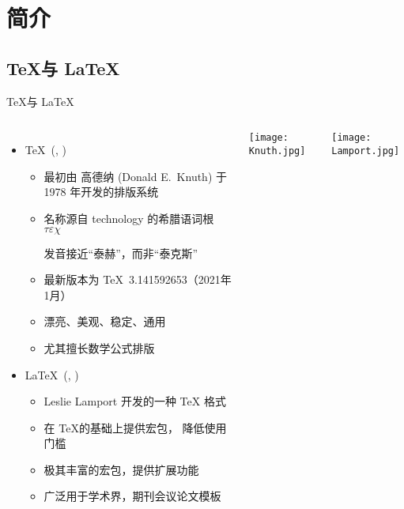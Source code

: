 
\section{简介}

\subsection{\TeX 与 \LaTeX}

\begin{frame}[fragile]{\TeX 与 \LaTeX}
  \begin{columns}[T]
    \begin{itemize}
      \item \TeX\ (,
        )
        \begin{itemize}
          \item 最初由 高德纳 (Donald E.~Knuth) 于 1978 年开发的排版系统
          \item 名称源自 technology 的希腊语词根 $\tau\varepsilon\chi$ \par
                发音接近“泰赫”，而非“泰克斯”
          \item 最新版本为 \TeX\ 3.141592653（2021年1月）
          \item 漂亮、美观、稳定、通用
          \item 尤其擅长数学公式排版
        \end{itemize}
      \item \LaTeX\ (, )
        \begin{itemize}
          \item Leslie Lamport 开发的一种 \TeX{} 格式
          \item 在 \TeX 的基础上提供宏包， 降低使用门槛
          \item 极其丰富的宏包，提供扩展功能
          \item 广泛用于学术界，期刊会议论文模板
        \end{itemize}
    \end{itemize}
    \texttt{[image: Knuth.jpg]}

    \texttt{[image: Lamport.jpg]}
  \end{columns}
\end{frame}

